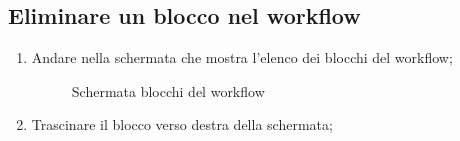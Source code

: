\subsection{Eliminare un blocco nel workflow}
\begin{enumerate}
	\item Andare nella schermata che mostra l'elenco dei blocchi del workflow;
	\begin{figure}[!ht]
		\centering
		\caption{Schermata blocchi del workflow}
	\end{figure}
	\item Trascinare il blocco verso destra della schermata;
	\begin{figure}[!ht]

\end{figure}
\end{enumerate}
